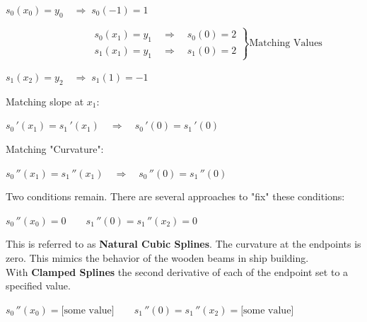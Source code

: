 \documentclass[a4paper,12pt,]{report}
\begin{document}
\begin{center} 
 $s_0(x_0)=y_0 \quad \Rightarrow \; s_0(-1)=1 \;\;\,$\\
\end{center}
 \vspace{-3mm}
$
  \left.
    \begin{array}{c}
\qquad \qquad \qquad \qquad \;\; s_0(x_1)=y_1 \quad \Rightarrow \quad s_0(0)=2\\
\qquad \qquad \qquad	\qquad \;\; s_1(x_1)=y_1 \quad \Rightarrow \quad s_1(0)=2
    \end{array}
  \right\}
	\text{Matching Values}
$\\
\begin{center}
\vspace{-5mm}
$s_1(x_2)=y_2 \quad \Rightarrow \; s_1(1)=-1\;\;\,$\\
\end{center}
\medskip
	\noindent Matching slope at $x_1$:\\
\begin{center}
\vspace{-7mm}
	$s_0\,'(x_1)=s_1\,'(x_1) \quad \Rightarrow \quad s_0\,'(0) = s_1\,'(0)$
\end{center}

\medskip
	\noindent Matching "Curvature":\\
\begin{center}
\vspace{-7mm}
	$s_0\,''(x_1)=s_1\,''(x_1) \quad \Rightarrow \quad s_0\,''(0) = s_1\,''(0)$
\end{center}
\medskip

	\noindent Two conditions remain.  There are several approaches to "fix" these conditions:
\begin{center}
	$s_0\,''(x_0)=0\qquad s_1\,''(0) = s_1\,''(x_2)=0$
\end{center}

	\noindent This is referred to as \textbf{Natural Cubic Splines}.  The curvature at the endpoints is zero.
	This mimics the behavior of the wooden beams in ship building.\\


	With \textbf{Clamped Splines} the second derivative of each of the endpoint set to a specified value.
\begin{center}
\vspace{-2mm}
	$s_0\,''(x_0)=\text{[some value]} \qquad s_1\,''(0) = s_1\,''(x_2)=\text{[some value]}$
\end{center}
\end{document}
